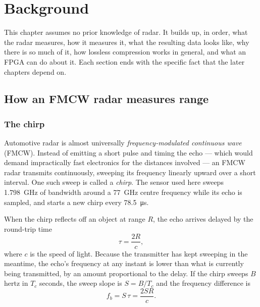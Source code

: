 \chapter{Background}
\label{ch:background}

This chapter assumes no prior knowledge of radar. It builds up, in order, what
the radar measures, how it measures it, what the resulting data looks like, why
there is so much of it, how lossless compression works in general, and what an
FPGA can do about it. Each section ends with the specific fact that the later
chapters depend on.

\section{How an FMCW radar measures range}
\label{sec:fmcw}

\subsection{The chirp}

Automotive radar is almost universally \emph{frequency-modulated continuous
wave} (FMCW). Instead of emitting a short pulse and timing the echo --- which
would demand impractically fast electronics for the distances involved --- an
FMCW radar transmits continuously, sweeping its frequency linearly upward over
a short interval. One such sweep is called a \emph{chirp}. The sensor used here
sweeps \SI{1.798}{\giga\hertz} of bandwidth around a \SI{77}{\giga\hertz}
centre frequency while its echo is sampled, and starts a new chirp every
\SI{78.5}{\micro\second}.

When the chirp reflects off an object at range $R$, the echo arrives delayed by
the round-trip time
\begin{equation}
\tau = \frac{2R}{c},
\end{equation}
where $c$ is the speed of light. Because the transmitter has kept sweeping in
the meantime, the echo's frequency at any instant is lower than what is
currently being transmitted, by an amount proportional to the delay. If the
chirp sweeps $B$ hertz in $T_c$ seconds, the sweep slope is $S = B/T_c$ and the
frequency difference is
\begin{equation}
\label{eq:beat}
f_b = S\,\tau = \frac{2 S R}{c}.
\end{equation}

